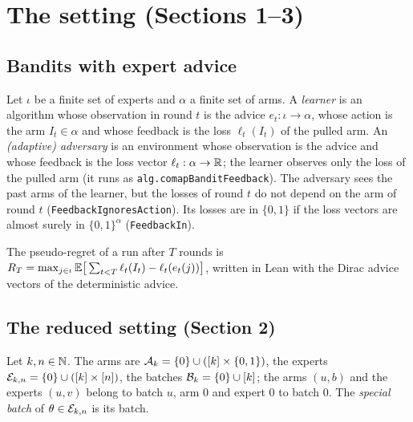 \chapter{The setting (Sections 1--3)}
\label{chap:setting}

\section{Bandits with expert advice}

\begin{definition}[Protocol]
  \label{def:protocol}
  \leanok
  Let $\iota$ be a finite set of experts and $\alpha$ a finite set of arms. A \emph{learner} is an
  algorithm whose observation in round $t$ is the advice $e_t : \iota \to \alpha$, whose action is
  the arm $I_t \in \alpha$ and whose feedback is the loss $\ell_t(I_t)$ of the pulled arm. An
  \emph{(adaptive) adversary} is an environment whose observation is the advice and whose feedback
  is the loss vector $\ell_t : \alpha \to \mathbb{R}$; the learner observes only the loss of the pulled arm
  (it runs as \texttt{alg.comapBanditFeedback}). The adversary sees the past arms of the learner,
  but the losses of round $t$ do not depend on the arm of round $t$
  (\texttt{FeedbackIgnoresAction}). Its losses are in $\{0,1\}$ if the loss vectors are almost
  surely in $\{0,1\}^\alpha$ (\texttt{FeedbackIn}).
\end{definition}

\begin{definition}
  \label{def:pseudo_regret}
  \leanok
  The pseudo-regret of a run after $T$ rounds is
  $R_T = \max_{j \in \iota} \mathbb{E}\big[\sum_{t < T} \ell_t(I_t) - \ell_t(e_t(j))\big]$, written in Lean
  with the Dirac advice vectors of the deterministic advice.
\end{definition}

\section{The reduced setting (Section 2)}

\begin{definition}
  \label{def:arm}
  \leanok
  Let $k, n \in \mathbb{N}$. The arms are $\mathcal{A}_k = \{0\} \cup ([k] \times \{0, 1\})$, the experts
  $\mathcal{E}_{k,n} = \{0\} \cup ([k] \times [n])$, the batches $\mathcal{B}_k = \{0\} \cup [k]$; the arms
  $(u, b)$ and the experts $(u, v)$ belong to batch $u$, arm $0$ and expert $0$ to batch $0$. The
  \emph{special batch} of $\theta \in \mathcal{E}_{k,n}$ is its batch.
\end{definition}

